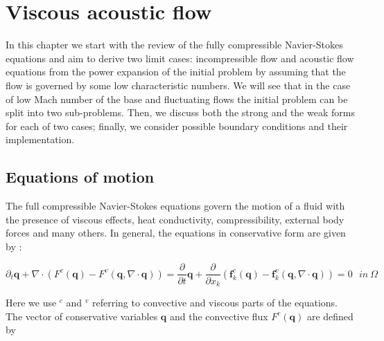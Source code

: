 
\chapter{Viscous acoustic flow}  %

\ifpdf
    \graphicspath{{Chapter1/Figs/Raster/}{Chapter1/Figs/PDF/}{Chapter1/Figs/}}
\else
    \graphicspath{{Chapter1/Figs/Vector/}{Chapter1/Figs/}}
\fi

In this chapter we start with the review of the fully compressible Navier-Stokes equations and aim to derive two limit cases: incompressible flow and acoustic flow equations from the power expansion of the initial problem by assuming that the flow is governed by some low characteristic numbers. We will see that in the case of low Mach number of the base and fluctuating flows the initial problem can be split into two sub-problems. Then, we discuss both the strong and the weak forms for each of two cases; finally, we consider possible boundary conditions and their implementation.

\section{Equations of motion}

The full compressible Navier-Stokes equations govern the motion of a fluid with the presence of viscous effects, heat conductivity, compressibility, external body forces and many others. In general, the equations in conservative form are given by \cite{LandauHydro}:

\begin{equation}
    \partial_t \textbf{q} +  \nabla  \cdot \left(F^c(\textbf{q}) - F^v(\textbf{q}, \nabla \cdot \textbf{q}) \right) = 
    \frac{\partial}{\partial t} \textbf{q} + \frac{\partial}{\partial x_k} \left( \textbf{f}^c_k(\textbf{q}) -  \textbf{f}^v_k(\textbf{q}, \nabla \cdot \textbf{q}) \right) = 0 \ \  \ in  \ \Omega
\end{equation}

Here we use $^c$ and $^v$ referring to convective and viscous parts of the equations. The vector of conservative variables $\textbf{q}$ and the convective flux $F^c(\textbf{q})$ are defined by

